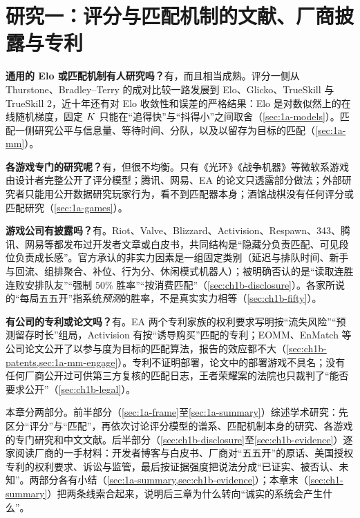 \chapter{研究一：评分与匹配机制的文献、厂商披露与专利}
\label{ch:lit}

\begin{answerbox}
\textbf{通用的 Elo 或匹配机制有人研究吗？}有，而且相当成熟。评分一侧从 Thurstone、Bradley–Terry 的成对比较一路发展到 Elo、Glicko、TrueSkill 与 TrueSkill 2，近十年还有对 Elo 收敛性和误差的严格结果：Elo 是对数似然上的在线随机梯度，固定 $K$ 只能在“追得快”与“抖得小”之间取舍（\cref{sec:1a-models}）。匹配一侧研究公平与信息量、等待时间、分队，以及以留存为目标的匹配（\cref{sec:1a-mm}）。

\textbf{各游戏专门的研究呢？}有，但很不均衡。只有《光环》《战争机器》等微软系游戏由设计者完整公开了评分模型；腾讯、网易、EA 的论文只透露部分做法；外部研究者只能用公开数据研究玩家行为，看不到匹配器本身；酒馆战棋没有任何评分或匹配研究（\cref{sec:1a-games}）。

\textbf{游戏公司有披露吗？}有。Riot、Valve、Blizzard、Activision、Respawn、343、腾讯、网易等都发布过开发者文章或白皮书，共同结构是“隐藏分负责匹配、可见段位负责成长感”。官方承认的非实力因素是一组固定类别（延迟与排队时间、新手与回流、组排聚合、补位、行为分、休闲模式机器人）；被明确否认的是“读取连胜连败安排队友”“强制 50\% 胜率”“按消费匹配”（\cref{sec:ch1b-disclosure}）。各家所说的“每局五五开”指系统\emph{预测}的胜率，不是真实实力相等（\cref{sec:ch1b-fifty}）。

\textbf{有公司的专利或论文吗？}有。EA 两个专利家族的权利要求写明按“流失风险”“预测留存时长”组局，Activision 有按“诱导购买”匹配的专利；EOMM、EnMatch 等公司论文公开了以参与度为目标的匹配算法，报告的效应都不大（\cref{sec:ch1b-patents,sec:1a-mm-engage}）。专利不证明部署，论文中的部署游戏不具名；没有任何厂商公开过可供第三方复核的匹配日志，王者荣耀案的法院也只裁判了“能否要求公开”（\cref{sec:ch1b-legal}）。
\end{answerbox}

本章分两部分。前半部分（\cref{sec:1a-frame}至\cref{sec:1a-summary}）综述学术研究：先区分“评分”与“匹配”，再依次讨论评分模型的谱系、匹配机制本身的研究、各游戏的专门研究和中文文献。后半部分（\cref{sec:ch1b-disclosure}至\cref{sec:ch1b-evidence}）逐家阅读厂商的一手材料：开发者博客与白皮书、厂商对“五五开”的原话、美国授权专利的权利要求、诉讼与监管，最后按证据强度把说法分成“已证实、被否认、未知”。两部分各有小结（\cref{sec:1a-summary,sec:ch1b-evidence}）；本章末（\cref{sec:ch1-summary}）把两条线索合起来，说明后三章为什么转向“诚实的系统会产生什么”。

